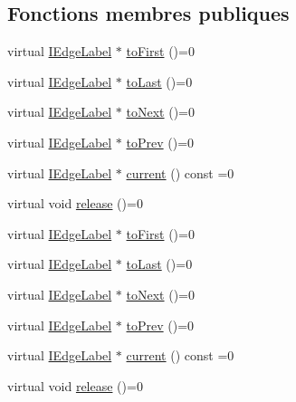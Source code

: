 \subsection*{Fonctions membres publiques}
\begin{DoxyCompactItemize}
\item 
virtual \hyperlink{class_i_edge_label}{I\+Edge\+Label} $\ast$ \hyperlink{class_i_edge_label_iterator_ab39455a112ab2d83ce5c0959d65cbd1c}{to\+First} ()=0
\item 
virtual \hyperlink{class_i_edge_label}{I\+Edge\+Label} $\ast$ \hyperlink{class_i_edge_label_iterator_a93a6b30c6ff183272a07a4d842c1821d}{to\+Last} ()=0
\item 
virtual \hyperlink{class_i_edge_label}{I\+Edge\+Label} $\ast$ \hyperlink{class_i_edge_label_iterator_a82758e23b6c81d12c5d06406021c4c9a}{to\+Next} ()=0
\item 
virtual \hyperlink{class_i_edge_label}{I\+Edge\+Label} $\ast$ \hyperlink{class_i_edge_label_iterator_ae6d84210a16d32200382eb3283cf55c9}{to\+Prev} ()=0
\item 
virtual \hyperlink{class_i_edge_label}{I\+Edge\+Label} $\ast$ \hyperlink{class_i_edge_label_iterator_a0388ab40454e7e2122fda97cfbdb22da}{current} () const  =0
\item 
virtual void \hyperlink{class_i_edge_label_iterator_ab09e8bb2dd68bb836398a02456c279d3}{release} ()=0
\item 
virtual \hyperlink{class_i_edge_label}{I\+Edge\+Label} $\ast$ \hyperlink{class_i_edge_label_iterator_ab39455a112ab2d83ce5c0959d65cbd1c}{to\+First} ()=0
\item 
virtual \hyperlink{class_i_edge_label}{I\+Edge\+Label} $\ast$ \hyperlink{class_i_edge_label_iterator_a93a6b30c6ff183272a07a4d842c1821d}{to\+Last} ()=0
\item 
virtual \hyperlink{class_i_edge_label}{I\+Edge\+Label} $\ast$ \hyperlink{class_i_edge_label_iterator_a82758e23b6c81d12c5d06406021c4c9a}{to\+Next} ()=0
\item 
virtual \hyperlink{class_i_edge_label}{I\+Edge\+Label} $\ast$ \hyperlink{class_i_edge_label_iterator_ae6d84210a16d32200382eb3283cf55c9}{to\+Prev} ()=0
\item 
virtual \hyperlink{class_i_edge_label}{I\+Edge\+Label} $\ast$ \hyperlink{class_i_edge_label_iterator_a0388ab40454e7e2122fda97cfbdb22da}{current} () const  =0
\item 
virtual void \hyperlink{class_i_edge_label_iterator_ab09e8bb2dd68bb836398a02456c279d3}{release} ()=0
\end{DoxyCompactItemize}


